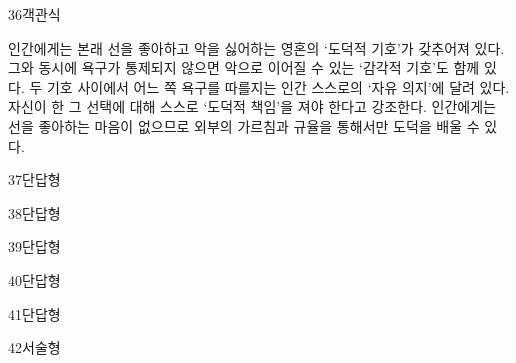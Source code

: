 \documentclass[fs9,seriesRus]{korfarm-base}
\begin{document}
\begin{kfQBlock}{36}{객관식}
\begin{kfChoices}
\kfChoice 인간에게는 본래 선을 좋아하고 악을 싫어하는 영혼의 ‘도덕적 기호’가 갖추어져 있다.
\kfChoice 그와 동시에 욕구가 통제되지 않으면 악으로 이어질 수 있는 ‘감각적 기호’도 함께 있다.
\kfChoice 두 기호 사이에서 어느 쪽 욕구를 따를지는 인간 스스로의 ‘자유 의지’에 달려 있다.
\kfChoice 자신이 한 그 선택에 대해 스스로 ‘도덕적 책임’을 져야 한다고 강조한다.
\kfChoice 인간에게는 선을 좋아하는 마음이 없으므로 외부의 가르침과 규율을 통해서만 도덕을 배울 수 있다.
\end{kfChoices}
\end{kfQBlock}
\begin{kfQBlock}{37}{단답형}
\end{kfQBlock}
\begin{kfQBlock}{38}{단답형}
\end{kfQBlock}
\begin{kfQBlock}{39}{단답형}
\end{kfQBlock}
\begin{kfQBlock}{40}{단답형}
\end{kfQBlock}
\begin{kfQBlock}{41}{단답형}
\end{kfQBlock}
\begin{kfQBlock}{42}{서술형}
\end{kfQBlock}
\kfEndMC



\clearpage

\begin{kfChapterAreaList}
\end{kfChapterAreaList}
\end{document}
